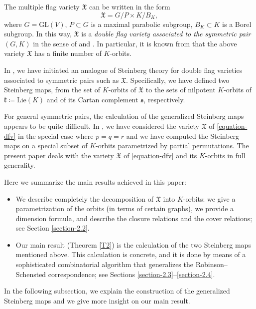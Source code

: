 \documentclass[ALCO,Unicode]{cedram}
\newcommand{\fk}{\mathfrak{k}}
\newcommand{\Xfv}{\mathfrak{X}}
\newcommand{\Lie}{\mathrm{Lie}}
\newcommand{\GL}{\mathrm{GL}}
\begin{document}
The multiple flag variety $\Xfv$ can be written in the form
\[
\Xfv=G/P\times K/B_K,
\]
where $G=\GL(V)$, $P\subset G$ is a maximal parabolic subgroup, $B_K\subset K$ is a Borel subgroup.
In this way, $\Xfv$ is a \textit{double flag variety associated to the symmetric pair}
$(G,K)$
in the sense of \cite{NO} and \cite{HNOO}.
In particular, it is known from \cite{NO} that the above variety $\Xfv$ has a finite number of $K$-orbits.

In \cite{FN1,FN2}, we have initiated an analogue of Steinberg theory for double flag varieties associated to symmetric pairs such as $\Xfv$.
Specifically, we have defined two Steinberg maps, from the set of $K$-orbits of $\Xfv$ to the sets of nilpotent $K$-orbits of $\fk\coloneqq \Lie(K)$ and of its Cartan complement $\mathfrak{s}$, respectively.

For general symmetric pairs, the calculation of the generalized Steinberg maps appears to be quite difficult.
In \cite{FN2}, we have considered the variety $\Xfv$ of \eqref{equation-dfv} in the special case where $p=q=r$ and we have computed the Steinberg maps on a special subset of $K$-orbits parametrized by partial permutations.
The present paper deals with the variety $\Xfv$ of \eqref{equation-dfv} and its $K$-orbits in full generality.

Here we summarize the main results achieved in this paper:
\begin{itemize}
\item We describe completely the decomposition of $\Xfv$ into $K$-orbits: we give a para\-metrization of the orbits (in terms of certain graphs), we provide a dimension formula, and describe the closure relations and the cover relations; see Section \ref{section-2.2}.
\item Our main result (Theorem \ref{T2}) is the calculation of the two Steinberg maps mentioned above. This calculation is concrete, and it is done by means of a sophisticated combinatorial algorithm that generalizes the Robinson--Schensted correspondence; see Sections \ref{section-2.3}--\ref{section-2.4}.
\end{itemize}
In the following subsection, we explain the construction of the generalized Steinberg maps and we give more insight on our main result.
\end{document}
